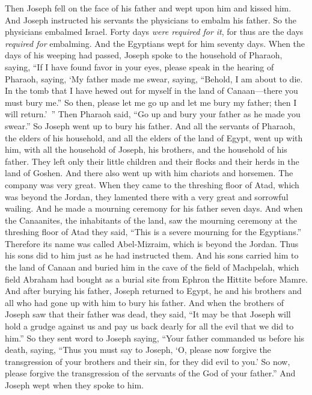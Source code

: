 \begin{biblechapter} %
 Then Joseph fell on the face of his father and wept upon him and kissed him.
\verse And Joseph instructed his servants the physicians to embalm his father. So the physicians embalmed Israel.
\verse Forty days \textit{were required for it}, for thus are the days \textit{required for} embalming. And the Egyptians wept for him seventy days.
\verse When the days of his weeping had passed, Joseph spoke to the household of Pharaoh, saying, “If I have found favor in your eyes, please speak in the hearing of Pharaoh, saying,
\verse ‘My father made me swear, saying, “Behold, I am about to die. In the tomb that I have hewed out for myself in the land of Canaan—there you must bury me.” So then, please let me go up and let me bury my father; then I will return.’ ”
\verse Then Pharaoh said, “Go up and bury your father as he made you swear.”
\verse So Joseph went up to bury his father. And all the servants of Pharaoh, the elders of his household, and all the elders of the land of Egypt, went up with him,
\verse with all the household of Joseph, his brothers, and the household of his father. They left only their little children and their flocks and their herds in the land of Goshen.
\verse And there also went up with him chariots and horsemen. The company was very great.
\verse When they came to the threshing floor of Atad, which was beyond the Jordan, they lamented there with a very great and sorrowful wailing. And he made a mourning ceremony for his father seven days.
\verse And when the Canaanites, the inhabitants of the land, saw the mourning ceremony at the threshing floor of Atad they said, “This is a severe mourning for the Egyptians.” Therefore its name was called Abel-Mizraim, which is beyond the Jordan.
\verse Thus his sons did to him just as he had instructed them.
\verse And his sons carried him to the land of Canaan and buried him in the cave of the field of Machpelah, which field Abraham had bought as a burial site from Ephron the Hittite before Mamre.
\verse And after burying his father, Joseph returned to Egypt, he and his brothers and all who had gone up with him to bury his father.
\verse And when the brothers of Joseph saw that their father was dead, they said, “It may be that Joseph will hold a grudge against us and pay us back dearly for all the evil that we did to him.”
\verse So they sent word to Joseph saying, “Your father commanded us before his death, saying,
\verse “Thus you must say to Joseph, ‘O, please now forgive the transgression of your brothers and their sin, for they did evil to you.’ So now, please forgive the transgression of the servants of the God of your father.” And Joseph wept when they spoke to him.

\end{biblechapter}

